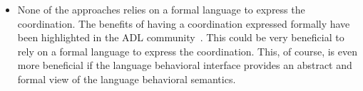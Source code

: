 \begin{itemize}
	\item None of the approaches relies on a formal language to express the coordination. The benefits of having a coordination expressed formally have been highlighted in the ADL community~\cite{wrightbib,rapidebib}. This could be very beneficial to rely on a formal language to express the coordination. This, of course, is even more beneficial if the language behavioral interface provides an abstract and formal view of the language behavioral semantics.
\end{itemize}

%	
%		
%		
%     
	
	
	
	
	
	
	
	
		
	 	
